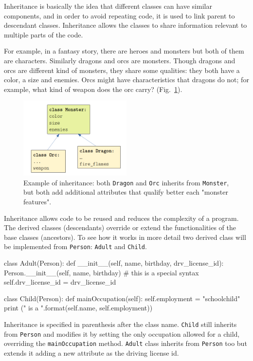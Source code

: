 Inheritance is basically the idea that different classes can have similar components, and in order to avoid repeating code, it is used to link parent to descendant classes. Inheritance allows the classes to share information relevant to multiple parts of the code.

For example, in a fantasy story, there are heroes and monsters but both of them are characters. Similarly dragons and orcs are monsters. Though dragons and orcs are different kind of monsters, they share some qualities: they both have a color, a size and enemies. Orcs might have characteristics that dragons do not; for example, what kind of weapon does the orc carry? (Fig.~\ref{fig:inheritance}). 

\begin{figure}[h]
  \centering
  \includegraphics[width=0.5\textwidth]{figures/inheritance.png}
  \caption{Example of inheritance: both \texttt{Dragon} and \texttt{Orc} inherits from \texttt{Monster}, but both add additional attributes that qualify better each "monster features".}
  \label{fig:inheritance}
\end{figure}

Inheritance allows code to be reused and reduces the complexity of a program. The derived classes (descendants) override or extend the functionalities of the base classes (ancestors). To see how it works in more detail two derived class will be implemented from \texttt{Person}: \texttt{Adult} and \texttt{Child}.

\begin{ipython}
class Adult(Person):
    def __init__(self, name, birthday, drv_license_id):
        Person.__init__(self, name, birthday) # this is a special syntax
        self.drv_license_id = drv_license_id

class Child(Person):
    def mainOccupation(self):
        self.employment = "schoolchild"
        print ("{} is a {}".format(self.name, self.employment))
\end{ipython}

Inheritance is specified in parenthesis after the class name. \texttt{Child} still inherits from \texttt{Person} and modifies it by setting the only occupation allowed for a child, overriding the \texttt{mainOccupation} method. \texttt{Adult} class inherits from \texttt{Person} too but extends it adding a new attribute as the driving license id. 

